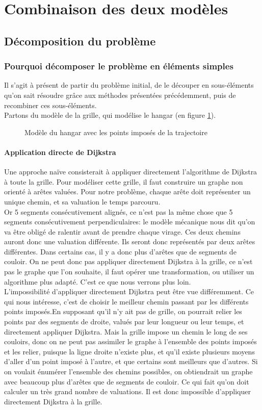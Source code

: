 \section{Combinaison des deux modèles}
\subsection{Décomposition du problème}
\subsubsection{Pourquoi décomposer le problème en éléments simples}
Il s'agit à présent de partir du problème initial, de le découper en sous-éléments qu'on sait résoudre grâce aux méthodes présentées précédemment, puis de recombiner ces sous-éléments.\\
Partons du modèle de la grille, qui modélise le hangar (en figure \ref{fig:grille1}).\\
\begin{figure}[h]
	\centering
	
	\caption{Modèle du hangar avec les points imposés de la trajectoire}
	\label{fig:grille1}
\end{figure}
\paragraph{Application directe de Dijkstra}Une approche naïve consisterait à appliquer directement l'algorithme de Dijkstra à toute la grille. Pour modéliser cette grille, il faut construire un graphe non orienté à arêtes valuées. Pour notre problème, chaque arête doit représenter un unique chemin, et sa valuation le temps parcouru.\\
Or 5 segments consécutivement alignés, ce n'est pas la même chose que 5 segments consécutivement perpendiculaires: le modèle mécanique nous dit qu'on va être obligé de ralentir avant de prendre chaque virage. Ces deux chemins auront donc une valuation différente. Ils seront donc représentés par deux arêtes différentes. Dans certains cas, il y a donc plus d'arêtes que de segments de couloir. On ne peut donc pas appliquer directement Dijkstra à la grille, ce n'est pas le graphe que l'on souhaite, il faut opérer une transformation, ou utiliser un algorithme plus adapté. C'est ce que nous verrons plus loin.\\
L'impossibilité d'appliquer directement Dijkstra peut être vue différemment. Ce qui nous intéresse, c'est de choisir le meilleur chemin passant par les différents points imposés.En supposant qu'il n'y ait pas de grille, on pourrait relier les points par des segments de droite, valués par leur longueur ou leur temps, et directement appliquer Dijkstra. Mais la grille impose un chemin le long de ses couloirs, donc on ne peut pas assimiler le graphe à l'ensemble des points imposés et les relier, puisque la ligne droite n'existe plus, et qu'il existe plusieurs moyens d'aller d'un point imposé à l'autre, et que certains sont meilleurs que d'autres. Si on voulait énumérer l'ensemble des chemins possibles, on obtiendrait un graphe avec beaucoup plus d'arêtes que de segments de couloir. Ce qui fait qu'on doit calculer un très grand nombre de valuations. Il est donc impossible d'appliquer directement Dijkstra à la grille.

